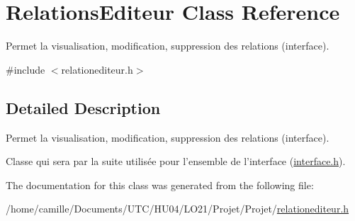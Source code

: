 \hypertarget{class_relations_editeur}{\section{Relations\-Editeur Class Reference}
\label{class_relations_editeur}
}


Permet la visualisation, modification, suppression des relations (interface).  




{\ttfamily \#include $<$relationediteur.\-h$>$}



\subsection{Detailed Description}
Permet la visualisation, modification, suppression des relations (interface). 

Classe qui sera par la suite utilisée pour l'ensemble de l'interface (\hyperlink{interface_8h}{interface.\-h}). 

The documentation for this class was generated from the following file\-:\begin{DoxyCompactItemize}
\item 
/home/camille/\-Documents/\-U\-T\-C/\-H\-U04/\-L\-O21/\-Projet/\-Projet/\hyperlink{relationediteur_8h}{relationediteur.\-h}\end{DoxyCompactItemize}
